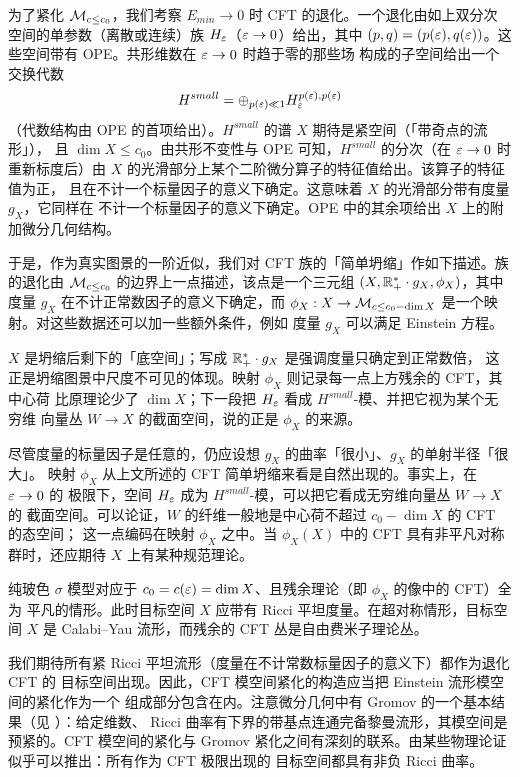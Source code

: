 为了紧化 $\mathcal{M}_{c\le c_0}$，我们考察 $E_{min}\to0$ 时 CFT 的退化。一个退化由如上双分次
空间的单参数（离散或连续）族 $H_{\varepsilon}$（$\varepsilon\to0$）给出，其中
$(p,q)=(p(\varepsilon),q(\varepsilon))$。这些空间带有 OPE。共形维数在 $\varepsilon\to0$ 时趋于零的那些场
构成的子空间给出一个交换代数
\[
  H^{small}=\oplus_{p(\varepsilon)\ll1}H_{\varepsilon}^{p(\varepsilon),p(\varepsilon)}
\]
（代数结构由 OPE 的首项给出）。$H^{small}$ 的谱 $X$ 期待是紧空间（「带奇点的流形」），
且 $\dim X\le c_0$。由共形不变性与 OPE 可知，$H^{small}$ 的分次（在 $\varepsilon\to0$ 时
重新标度后）由 $X$ 的光滑部分上某个二阶微分算子的特征值给出。该算子的特征值为正，
且在不计一个标量因子的意义下确定。这意味着 $X$ 的光滑部分带有度量 $g_X$，它同样在
不计一个标量因子的意义下确定。OPE 中的其余项给出 $X$ 上的附加微分几何结构。

于是，作为真实图景的一阶近似，我们对 CFT 族的「简单坍缩」作如下描述。族的退化由
$\mathcal{M}_{c\le c_0}$ 的边界上一点描述，该点是一个三元组
$(X,\mathbb{R}^*_+\cdot g_X,\phi_X)$，其中度量 $g_X$ 在不计正常数因子的意义下确定，而
$\phi_X:X\to\mathcal{M}_{c\le c_0-\dim X}$ 是一个映射。对这些数据还可以加一些额外条件，例如
度量 $g_X$ 可以满足 Einstein 方程。

\begin{yizhu}
$X$ 是坍缩后剩下的「底空间」；写成 $\mathbb{R}^*_+\cdot g_X$ 是强调度量只确定到正常数倍，
这正是坍缩图景中尺度不可见的体现。映射 $\phi_X$ 则记录每一点上方残余的 CFT，其中心荷
比原理论少了 $\dim X$；下一段把 $H_{\varepsilon}$ 看成 $H^{small}$-模、并把它视为某个无穷维
向量丛 $W\to X$ 的截面空间，说的正是 $\phi_X$ 的来源。
\end{yizhu}

尽管度量的标量因子是任意的，仍应设想 $g_X$ 的曲率「很小」、$g_X$ 的单射半径「很大」。
映射 $\phi_X$ 从上文所述的 CFT 简单坍缩来看是自然出现的。事实上，在 $\varepsilon\to0$ 的
极限下，空间 $H_{\varepsilon}$ 成为 $H^{small}$-模，可以把它看成无穷维向量丛 $W\to X$ 的
截面空间。可以论证，$W$ 的纤维一般地是中心荷不超过 $c_0-\dim X$ 的 CFT 的态空间；
这一点编码在映射 $\phi_X$ 之中。当 $\phi_X(X)$ 中的 CFT 具有非平凡对称群时，还应期待
$X$ 上有某种规范理论。

纯玻色 $\sigma$ 模型对应于 $c_0=c(\varepsilon)=\dim X$、且残余理论（即 $\phi_X$ 的像中的 CFT）全为
平凡的情形。此时目标空间 $X$ 应带有 Ricci 平坦度量。在超对称情形，目标空间 $X$ 是
Calabi--Yau 流形，而残余的 CFT 丛是自由费米子理论丛。

\begin{rmk}
我们期待所有紧 Ricci 平坦流形（度量在不计常数标量因子的意义下）都作为退化 CFT 的
目标空间出现。因此，CFT 模空间紧化的构造应当把 Einstein 流形模空间的紧化作为一个
组成部分包含在内。注意微分几何中有 Gromov 的一个基本结果（见 \cite{G}）：给定维数、
Ricci 曲率有下界的带基点连通完备黎曼流形，其模空间是预紧的。CFT 模空间的紧化与
Gromov 紧化之间有深刻的联系。由某些物理论证似乎可以推出：所有作为 CFT 极限出现的
目标空间都具有非负 Ricci 曲率。
\end{rmk}

